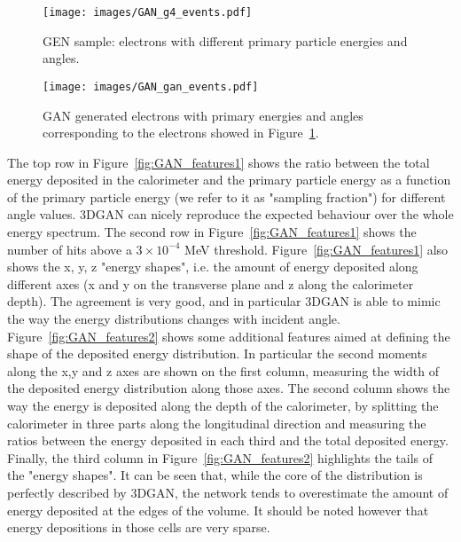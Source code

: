 \begin{figure}[htbp]
    \texttt{[image: images/GAN\_g4\_events.pdf]}
    \caption{GEN sample: electrons with different primary particle energies and angles.}
    \label{fig:GEANT4_events}
\end{figure}

\begin{figure}[htbp]
    \texttt{[image: images/GAN\_gan\_events.pdf]}
    \caption{GAN generated electrons with primary energies and angles corresponding to the electrons showed in Figure~\ref{fig:GEANT4_events}.}
    \label{fig:GAN_events}
\end{figure}

The top row in Figure~\ref{fig:GAN_features1} shows the ratio between the total energy deposited in the calorimeter and the primary particle energy as a function of the primary particle energy (we refer to it as "sampling fraction") for different angle values. 3DGAN can nicely reproduce the expected behaviour over the whole energy spectrum. The second row in Figure~\ref{fig:GAN_features1} shows the number of hits above a $3 \times 10^{-4}$ MeV threshold. Figure~\ref{fig:GAN_features1} also shows the x, y, z "energy shapes", i.e. the amount of energy deposited along different axes (x and y on the transverse plane and z along the calorimeter depth). The agreement is very good, and in particular 3DGAN is able to mimic the way the energy distributions changes with incident angle. 
Figure~\ref{fig:GAN_features2} shows some additional features aimed at defining the shape of the deposited energy distribution. In particular the second moments along the x,y and z axes are shown on the first column, measuring the width of the deposited energy distribution along those axes. The second column shows the way the energy is deposited along the depth of the calorimeter, by splitting the calorimeter in three parts along the longitudinal direction and measuring the ratios between the energy deposited in each third  and the total deposited energy. Finally, the third column in Figure~\ref{fig:GAN_features2} highlights the tails of the "energy shapes". It can be seen that, while the core of the distribution is perfectly described by 3DGAN, the network tends to overestimate the amount of energy deposited at the edges of the volume. It should be noted however that energy depositions in those cells are very sparse. 
\iffalse
